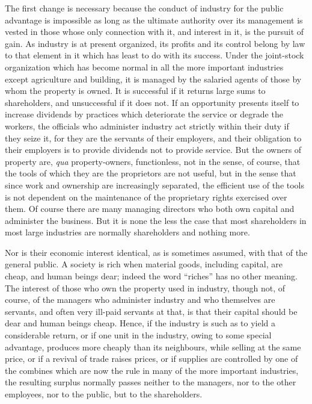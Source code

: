 \documentclass{book}
\begin{document}
The first change is necessary because the conduct of industry for the public advantage is impossible as long as the ultimate authority over its management is vested in those whose only connection with it, and interest in it, is the pursuit of gain. As industry is at present organized, its profits and its control belong by law to that element in it which has least to do with its success. Under the joint-stock organization which has become normal in all the more important industries except agriculture and building, it is managed by the salaried agents of those by whom the property is owned. It is successful if it returns large sums to shareholders, and unsuccessful if it does not. If an opportunity presents itself to increase dividends by practices which deteriorate the service or degrade the workers, the officials who administer industry act strictly within their duty if they seize it, for they are the servants of their employers, and their obligation to their employers is to provide dividends not to provide service. But the owners of property are, \emph{qua} property-owners, functionless, not in the sense, of course, that the tools of which they are the proprietors are not useful, but in the sense that since work and ownership are increasingly separated, the efficient use of the tools is not dependent on the maintenance of the proprietary rights exercised over them. Of course there are many managing directors who both own capital and administer the business. But it is none the less the case that most shareholders in most large industries are normally shareholders and nothing more.

Nor is their economic interest identical, as is sometimes assumed, with that of the general public. A society is rich when material goods, including capital, are cheap, and human beings dear; indeed the word “riches” has no other meaning. The interest of those who own the property used in industry, though not, of course, of the managers who administer industry and who themselves are servants, and often very ill-paid servants at that, is that their capital should be dear and human beings cheap. Hence, if the industry is such as to yield a considerable return, or if one unit in the industry, owing to some special advantage, produces more cheaply than its neighbours, while selling at the same price, or if a revival of trade raises prices, or if supplies are controlled by one of the combines which are now the rule in many of the more important industries, the resulting surplus normally passes neither to the managers, nor to the other employees, nor to the public, but to the shareholders.
\end{document}
